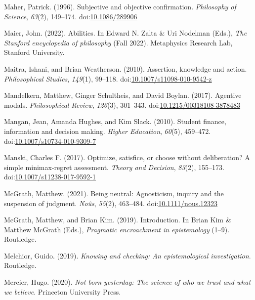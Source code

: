 \documentclass[
  10pt,
  letterpaper,
  twoside]{scrbook}
\newlength{\cslhangindent}
\newenvironment{CSLReferences}[2] %
 {\begin{list}{}{%
  \setlength{\itemindent}{0pt}
  \setlength{\leftmargin}{0pt}
  \setlength{\parsep}{0pt}
  \ifodd #1
   \setlength{\leftmargin}{\cslhangindent}
   \setlength{\itemindent}{-1\cslhangindent}
  \fi
  \setlength{\itemsep}{#2\baselineskip}}}
 {\end{list}}
\begin{document}
\begin{CSLReferences}{1}{0}
Maher, Patrick. (1996). Subjective and objective confirmation.
\emph{Philosophy of Science}, \emph{63}(2), 149--174.
doi:\href{https://doi.org/10.1086/289906}{10.1086/289906}

Maier, John. (2022). {Abilities}. In Edward N. Zalta \& Uri Nodelman
(Eds.), \emph{The {Stanford} encyclopedia of philosophy} ({F}all 2022).
Metaphysics Research Lab, Stanford University.

Maitra, Ishani, and Brian Weatherson. (2010). Assertion, knowledge and
action. \emph{Philosophical Studies}, \emph{149}(1), 99--118.
doi:\href{https://doi.org/10.1007/s11098-010-9542-z}{10.1007/s11098-010-9542-z}

Mandelkern, Matthew, Ginger Schultheis, and David Boylan. (2017).
Agentive modals. \emph{Philosophical Review}, \emph{126}(3), 301--343.
doi:\href{https://doi.org/10.1215/00318108-3878483}{10.1215/00318108-3878483}

Mangan, Jean, Amanda Hughes, and Kim Slack. (2010). Student finance,
information and decision making. \emph{Higher Education}, \emph{60}(5),
459--472.
doi:\href{https://doi.org/10.1007/s10734-010-9309-7}{10.1007/s10734-010-9309-7}

Manski, Charles F. (2017). Optimize, satisfice, or choose without
deliberation? A simple minimax-regret assessment. \emph{Theory and
Decision}, \emph{83}(2), 155--173.
doi:\href{https://doi.org/10.1007/s11238-017-9592-1}{10.1007/s11238-017-9592-1}

McGrath, Matthew. (2021). Being neutral: Agnosticism, inquiry and the
suspension of judgment. \emph{No{û}s}, \emph{55}(2), 463--484.
doi:\href{https://doi.org/10.1111/nous.12323}{10.1111/nous.12323}

McGrath, Matthew, and Brian Kim. (2019). Introduction. In Brian Kim \&
Matthew McGrath (Eds.), \emph{Pragmatic encroachment in epistemology}
(1--9). Routledge.

Melchior, Guido. (2019). \emph{Knowing and checking: An epistemological
investigation}. Routledge.

Mercier, Hugo. (2020). \emph{Not born yesterday: The science of who we
trust and what we believe}. Princeton University Press.


\end{CSLReferences}
\end{document}
